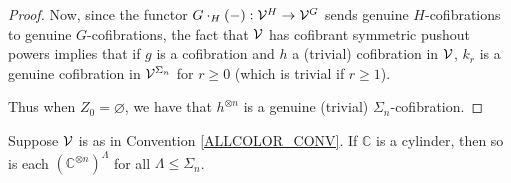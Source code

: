 \documentclass[a4paper,10pt
,draft
]{article}%
\renewcommand{\1}{\eta}%
\begin{document}
\begin{proof}
      Now, since the functor $G \cdot_H (-): \mathcal V^H \to \mathcal V^G$ sends genuine $H$-cofibrations to genuine $G$-cofibrations,
      the fact that $\mathcal V$ has cofibrant symmetric pushout powers implies that
      if $g$ is a cofibration and $h$ a (trivial) cofibration in $\mathcal V$,
      $k_r$ is a genuine cofibration in $\mathcal V^{\Sigma_n}$ for $r \geq 0$ (which is trivial if $r \geq 1$).

      Thus when $Z_0 = \varnothing$, we have that $h^{\otimes n}$ is a genuine (trivial) $\Sigma_n$-cofibration.
\end{proof}

\begin{lemma}
      \label{ASSEM_HOM_LEM}
      Suppose $\mathcal V$ is as in Convention \ref{ALLCOLOR_CONV}. %
      If $\mathbb C$ is a cylinder, then so is each $\left(\mathbb C^{\otimes n}\right)^{\Lambda}$ for all $\Lambda \leq \Sigma_n$.
\end{lemma}
\end{document}
